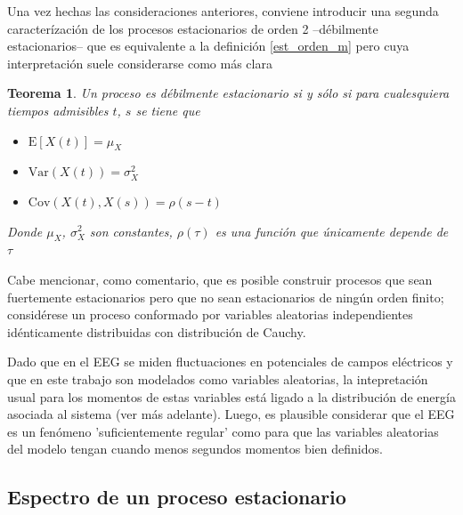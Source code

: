 \documentclass[12pt,a4paper]{mitthesis}
\newtheorem{thrm}{Teorema}
\newcommand{\E}[1]{\mathrm{E}\left[ #1 \right]}
\newcommand{\Var}[1]{\mathrm{Var}\left( #1 \right)}
\newcommand{\Cov}[1]{\mathrm{Cov}\left( #1 \right)}
\begin{document}
Una vez hechas las consideraciones anteriores, conviene introducir una segunda caracter\'izaci\'on 
de los procesos estacionarios de orden 2 --d\'ebilmente estacionarios-- que es equivalente a la 
definici\'on \ref{est_orden_m} pero cuya interpretaci\'on suele considerarse como m\'as clara
\begin{thrm}
Un proceso es d\'ebilmente estacionario si y s\'olo si para cualesquiera tiempos admisibles $t$, 
$s$ se tiene que
\begin{itemize}
\item $\E{X(t)} = \mu_X$
\item $\Var{X(t)} = \sigma^{2}_X$
\item $\Cov{X(t),X(s)} = \rho (s-t)$
\end{itemize}
Donde $\mu_X$, $\sigma^{2}_X$ son constantes, $\rho(\tau)$ es una funci\'on que \'unicamente 
depende de $\tau$
\label{est_usual}
\end{thrm}

Cabe mencionar, como comentario, que es posible construir procesos que sean fuertemente 
estacionarios pero que no sean estacionarios de ning\'un orden finito; 
consid\'erese un proceso conformado por variables aleatorias independientes id\'enticamente 
distribuidas con distribuci\'on de Cauchy.

Dado que en el EEG se miden fluctuaciones en potenciales de campos el\'ectricos y que en este 
trabajo son modelados como variables aleatorias, la intepretaci\'on usual para los momentos de 
estas variables est\'a ligado a la distribuci\'on de energ\'ia asociada al sistema (ver m\'as
adelante). Luego, es plausible considerar que el EEG es un fen\'omeno 'suficientemente regular' como 
para que las variables aleatorias del modelo tengan cuando menos segundos momentos bien definidos.%


\subsection{Espectro de un proceso estacionario}
\end{document}
